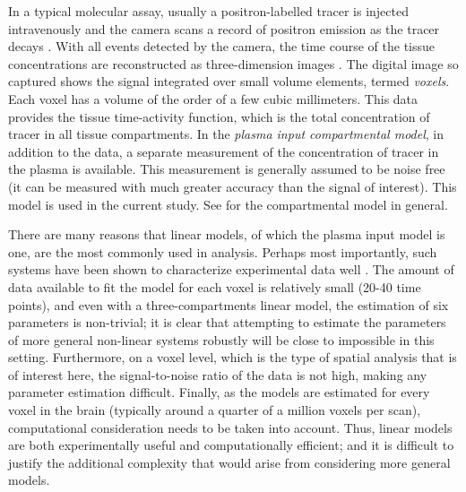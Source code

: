 In a typical molecular assay, usually a positron-labelled tracer is injected intravenously and the \pet camera scans a record of positron emission as the tracer decays \cite{Phelps2000}. With all events detected by the \pet camera, the time course of the tissue concentrations are reconstructed as three-dimension images \cite{Kinahan1989}. The digital image so captured shows the signal integrated over small volume elements, termed \emph{voxels}. Each voxel has a volume of the order of a few cubic millimeters. This data provides the tissue time-activity function, which is the total concentration of tracer in all tissue compartments. In the \emph{plasma input compartmental model}, in addition to the \pet data, a separate measurement of the concentration of tracer in the plasma is available. This measurement is generally assumed to be noise free (it can be measured with much greater accuracy than the signal of interest). This model is used in the current study. See \cite{Gunn:2001cx} for the \pet compartmental model in general.

There are many reasons that linear \ode models, of which the plasma input model is one, are the most commonly used in \pet analysis. Perhaps most importantly, such systems have been shown to characterize \pet experimental data well \cite{Lammertsma96}. The amount of data available to fit the model for each voxel is relatively small (20-40 time points), and even with a three-compartments linear \ode model, the estimation of six parameters is non-trivial; it is clear that attempting to estimate the parameters of more general non-linear \ode systems robustly will be close to impossible in this setting. Furthermore, on a voxel level, which is the type of spatial analysis that is of interest here, the signal-to-noise ratio of the data is not high, making any parameter estimation difficult. Finally, as the models are estimated for every voxel in the brain (typically around a quarter of a million voxels per scan), computational consideration needs to be taken into account. Thus, linear \ode models are both experimentally useful and computationally efficient; and it is difficult to justify the additional complexity that would arise from considering more general models.




